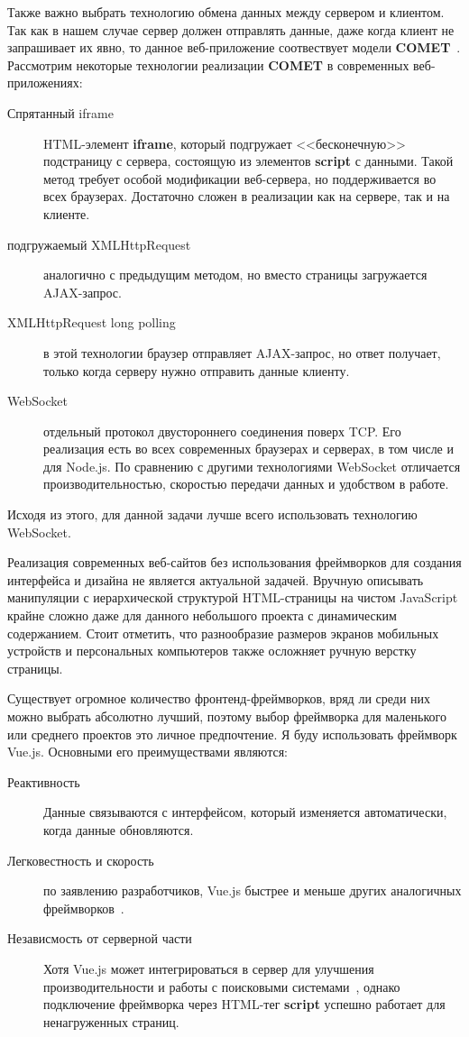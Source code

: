 Также важно выбрать технологию обмена данных между сервером и клиентом. Так как в нашем случае сервер должен отправлять данные, даже когда клиент не запрашивает их явно, то данное веб-приложение соотвествует модели \textbf{COMET}~\autocite{Krill07}. Рассмотрим некоторые технологии реализации \textbf{COMET} в современных веб-приложениях:

\begin{description}
	\item[Спрятанный iframe] HTML-элемент \textbf{iframe}, который подгружает <<бесконечную>> подстраницу с сервера, состоящую из элементов \textbf{script} с данными. Такой метод требует особой модификации веб-сервера, но поддерживается во всех браузерах. Достаточно сложен в реализации как на сервере, так и на клиенте. 
	\item[подгружаемый XMLHttpRequest] аналогично с предыдущим методом, но вместо страницы загружается AJAX-запрос.
	\item[XMLHttpRequest long polling] в этой технологии браузер отправляет AJAX-запрос, но ответ получает, только когда серверу нужно отправить данные клиенту. 
	\item[WebSocket] отдельный протокол двустороннего соединения поверх TCP. Его реализация есть во всех современных браузерах и серверах, в том числе и для Node.js. По сравнению с другими технологиями WebSocket отличается производительностью, скоростью передачи данных и удобством в работе.
\end{description}

Исходя из этого, для данной задачи лучше всего использовать технологию WebSocket.

Реализация современных веб-сайтов без использования фреймворков для создания интерфейса и дизайна не является актуальной задачей. Вручную описывать манипуляции с иерархической структурой HTML-страницы на чистом JavaScript крайне сложно даже для данного небольшого проекта с динамическим содержанием. Стоит отметить, что разнообразие размеров экранов мобильных устройств и персональных компьютеров также осложняет ручную верстку страницы.

Существует огромное количество фронтенд-фреймворков, вряд ли среди них можно выбрать абсолютно лучший, поэтому выбор фреймворка для маленького или среднего проектов это личное предпочтение. Я буду использовать фреймворк Vue.js. Основными его преимуществами являются:
	\begin{description}
		\item[Реактивность] Данные связываются с интерфейсом, который изменяется автоматически, когда данные обновляются.  
		\item[Легковестность и скорость] по заявлению разработчиков, Vue.js быстрее и меньше других аналогичных фреймворков~\autocite{vue}. 
		\item[Независмость от серверной части] Хотя Vue.js может интегрироваться в сервер для улучшения производительности и работы с поисковыми системами~\autocite{vue2}, однако подключение фреймворка через HTML-тег \textbf{script} успешно работает для ненагруженных страниц.  
		
	\end{description}    
 
